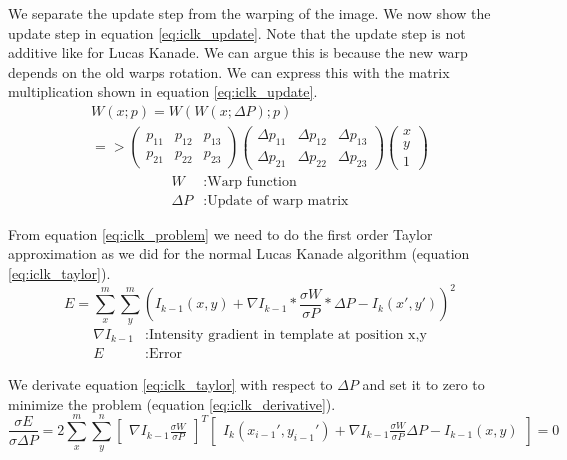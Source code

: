 \documentclass[11pt,a4paper,titlepage,oneside]{report}
\begin{document}
We separate the update step from the warping of the image. We now show the update step in equation \ref{eq:iclk_update}. Note that the update step is not additive like for Lucas Kanade. We can argue this is because the new warp depends on the old warps rotation. We can express this with the matrix multiplication shown in equation \ref{eq:iclk_update}.
\begin{equation}\label{eq:iclk_update}
  \begin{gathered}
    W(x;p)=W(W(x;\Delta P); p)\\
    =>
    \begin{pmatrix}
    p_{11} & p_{12} & p_{13} \\
    p_{21} & p_{22} & p_{23}
    \end{pmatrix}
    \begin{pmatrix}
      \Delta p_{11} & \Delta p_{12} & \Delta p_{13} \\
      \Delta p_{21} & \Delta p_{22} & \Delta p_{23}
    \end{pmatrix}
    \begin{pmatrix}
      x\\
      y\\
      1
    \end{pmatrix}
  \end{gathered}
\end{equation}
\begin{align*}
  W               &: \text{Warp function}\\
  \Delta P        &: \text{Update of warp matrix}
\end{align*}

From equation \ref{eq:iclk_problem} we need to do the first order Taylor approximation as we did for the normal Lucas Kanade algorithm (equation \ref{eq:iclk_taylor}).
\begin{equation}\label{eq:iclk_taylor}
  E=\sum_x^m\sum_y^m(I_{k-1}(x,y)+\nabla I_{k-1}*\frac{\sigma W}{\sigma P}*\Delta P-I_{k}(x',y'))^2
\end{equation}
\begin{align*}
  \nabla I_{k-1}  &: \text{Intensity gradient in template at position x,y}\\
  E               &: \text{Error}
\end{align*}

We derivate equation \ref{eq:iclk_taylor} with respect to $\Delta P$ and set it to zero to minimize the problem (equation \ref{eq:iclk_derivative}).
\tiny
\begin{equation}\label{eq:iclk_derivative}
  \frac{\sigma E}{\sigma \Delta P}=2\sum_x^m\sum_y^n\begin{bmatrix}\nabla I_{k-1}\frac{\sigma W}{\sigma P}\end{bmatrix}^T\begin{bmatrix}I_{k}(x_{i-1}',y_{i-1}')+\nabla I_{k-1}\frac{\sigma W}{\sigma P}\Delta P-I_{k-1}(x,y)\end{bmatrix}=0
\end{equation}
\normalsize
\end{document}
